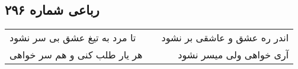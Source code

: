 \begin{center}
\section*{رباعی شماره ۲۹۶}
\label{sec:sh296}
\begin{longtable}{l p{0.5cm} r}
تا مرد به تیغ عشق بی سر نشود
&&
اندر ره عشق و عاشقی بر نشود
\\
هر یار طلب کنی و هم سر خواهی
&&
آری خواهی ولی میسر نشود
\\
\end{longtable}
\end{center}
